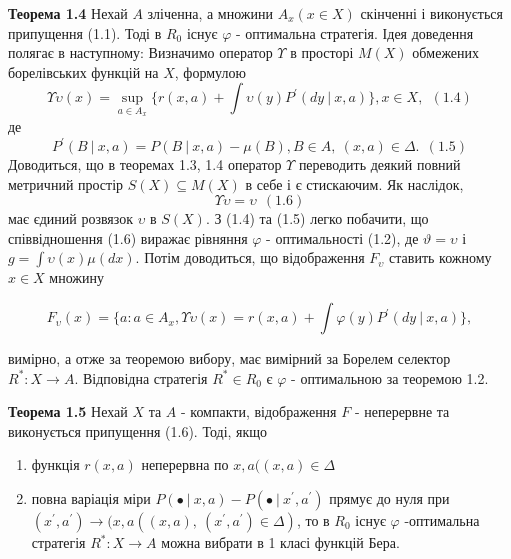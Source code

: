 \documentclass[a4paper, 14pt]{extarticle}
\begin{document}
\textbf{Теорема 1.4}\newline
Нехай $A$ зліченна, а множини $A_x (x \in X)$ скінченні і виконується припущення (1.1). Тоді в $R_0$ існує $\varphi $ - оптимальна стратегія. Ідея доведення полягає в наступному:\newline 
Визначимо оператор $\Upsilon$ в просторі $M(X)$ обмежених борелівських функцій на $X$, формулою
$$ \Upsilon \upsilon(x) = \sup_{a \in A_x} \lbrace r(x,a) + \int \upsilon(y)P^{'}(dy \ | \ x,a)  \rbrace, x \in X,  \ \ (1.4)$$ де 
$$ P^{'}(B \ | \ x,a) = P(B \ | \ x,a) - \mu(B), B \in A, \ (x,a) \in \Delta.  \ \ (1.5)$$\newline
Доводиться, що в теоремах 1.3, 1.4 оператор $\Upsilon$ переводить деякий повний метричний простір $S(X)\subseteq M(X)$  в себе і є  стискаючим. Як наслідок,
 $$\Upsilon \upsilon = \upsilon \ \ (1.6)$$ 
 має єдиний розвязок $\upsilon$ в $S(X) $. З (1.4) та (1.5) легко побачити, що \\ співвідношення (1.6) виражає рівняння $\varphi$ - оптимальності (1.2), де $ \vartheta = \upsilon   $ і $ g = \int \upsilon(x) \mu(dx)$. Потім доводиться, що відображення $F_{\upsilon}$ ставить кожному $x \in X$ множину 

 $$ F_{\upsilon}(x) = \lbrace a:a \in A_x, \Upsilon \upsilon(x) = r(x,a)+ \int \varphi(y)P^{'}(dy \ | \ x,a) \rbrace, $$ 
 
 вимірно, а отже за теоремою вибору, має вимірний за Борелем селектор  $R^{*}:X \rightarrow A$. Відповідна стратегія  $R^{*} \in R_0$ є $ \varphi $ - оптимальною за теоремою 1.2.\newline\newline
 

 
 \textbf{Теорема 1.5}\newline
Нехай $X $ та $A$ - компакти, відображення $F$ - неперервне та виконується припущення (1.6).\newline
 Тоді, якщо \newline
\begin{enumerate}
	\item функція $r(x,a)$ неперервна по $x,a ((x,a) \in \Delta$
	\item повна варіація міри $P(\bullet  \ | \ x,a)-P(\bullet  \ | \ x^{'},a^{'})$ прямує до нуля при $(x^{'},a^{'}) \rightarrow (x,a((x,a), \ (x^{'},a^{'}) \in \Delta)$, то в $R_0$ існує $\varphi$ -оптимальна стратегія $R^{*} : X \rightarrow A$ можна вибрати в 1 класі функцій Бера.
\end{enumerate}
\end{document}
